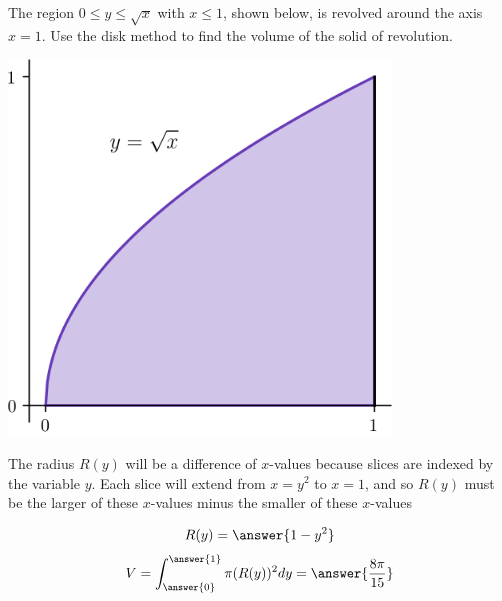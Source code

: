 \documentclass{ximera}
\begin{document}
\begin{exercise}
The region $0 \leq y \leq \sqrt{x}$ with $x \leq 1$, shown below, is revolved around the axis $x=1$. Use the disk method to find the volume of the solid of revolution.
\begin{center}
\begin{image}
\includegraphics[width=4in]{diskwasher/disk02.png}
\end{image}
\end{center}
\begin{hint}
The radius $R(y)$ will be a difference of $x$-values because slices are indexed by the variable $y$.
Each slice will extend from $x = y^2$ to $x = 1$, and so $R(y)$ must be the larger of these $x$-values minus the smaller of these $x$-values
\end{hint}
\begin{prompt}
\[ R(y) = \answer{1 - y^2} \]
\[ V = \int_{\answer{0}}^{\answer{1}} \pi (R(y))^2 dy = \answer{\frac{8\pi}{15}} \]
\end{prompt}
\end{exercise}
\end{document}
